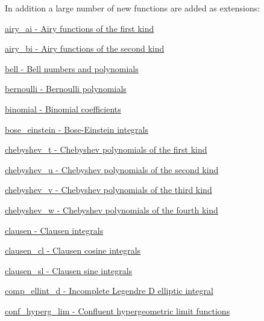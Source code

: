 In addition a large number of new functions are added as extensions\+:
\begin{DoxyItemize}
\item \hyperlink{group__gnu__math__spec__func_gac84f8c4ad00ee677ad4d0b785925d983}{airy\+\_\+ai -\/ Airy functions of the first kind}
\item \hyperlink{group__gnu__math__spec__func_ga33c172cab7f8e9c99537444c7e30801a}{airy\+\_\+bi -\/ Airy functions of the second kind}
\item \hyperlink{group__gnu__math__spec__func_gac07286d722248a7f3c65a13b49b1fef5}{bell -\/ Bell numbers and polynomials}
\item \hyperlink{group__gnu__math__spec__func_gad339f0011df1967ec6c9e55bd1547bf4}{bernoulli -\/ Bernoulli polynomials}
\item \hyperlink{group__gnu__math__spec__func_gabd0cf6e3f1e1d36c4c45f118e34a5ca2}{binomial -\/ Binomial coefficients}
\item \hyperlink{group__gnu__math__spec__func_gae8135b6861a48f2cee2e692093a17102}{bose\+\_\+einstein -\/ Bose-\/\+Einstein integrals}
\item \hyperlink{group__gnu__math__spec__func_ga4d9cae9de13a64ceeb4fb0226f4b7844}{chebyshev\+\_\+t -\/ Chebyshev polynomials of the first kind}
\item \hyperlink{group__gnu__math__spec__func_gafa90c06bdedb8459f20576297cf1608f}{chebyshev\+\_\+u -\/ Chebyshev polynomials of the second kind}
\item \hyperlink{group__gnu__math__spec__func_ga32b7decd0002f542d2c9187c5f0846c6}{chebyshev\+\_\+v -\/ Chebyshev polynomials of the third kind}
\item \hyperlink{group__gnu__math__spec__func_gaa156c6c21e99104ebcb627e92aceada0}{chebyshev\+\_\+w -\/ Chebyshev polynomials of the fourth kind}
\item \hyperlink{group__gnu__math__spec__func_ga54e4ba71b1f81718d6998349f91ff88f}{clausen -\/ Clausen integrals}
\item \hyperlink{group__gnu__math__spec__func_ga8786b86db309998f93f877cfb9bdfd57}{clausen\+\_\+cl -\/ Clausen cosine integrals}
\item \hyperlink{group__gnu__math__spec__func_gacb757b00309213cd96bb2bc6b5dc3c24}{clausen\+\_\+sl -\/ Clausen sine integrals}
\item \hyperlink{group__gnu__math__spec__func_ga3fe79a91524b43ffc5ffb83c0eb2bd00}{comp\+\_\+ellint\+\_\+d -\/ Incomplete Legendre D elliptic integral}
\item \hyperlink{group__gnu__math__spec__func_ga9fe7a5e2e741f56d88fd29bc249feab2}{conf\+\_\+hyperg\+\_\+lim -\/ Confluent hypergeometric limit functions}

\end{DoxyItemize}
